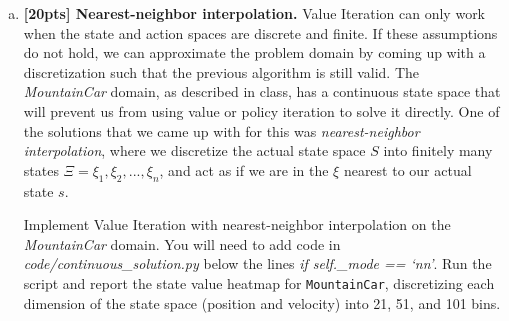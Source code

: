 \documentclass{article}
\begin{document}
\begin{enumerate}[(a)]

\item {\bf [20pts] Nearest-neighbor interpolation.} Value Iteration can only work when the state and action spaces are discrete and finite. If these assumptions do not hold, we can approximate the problem domain by coming up with a discretization such that the previous algorithm is still valid. The \textit{MountainCar} domain, as described in class, has a continuous state space that will prevent us from using value or policy iteration to solve it directly. One of the solutions that we came up with for this was \emph{nearest-neighbor interpolation}, where we discretize the actual state space $S$ into finitely many states $\Xi={\xi_1, \xi_2,...,\xi_n}$, and act as if we are in the $\xi$ nearest to our actual state $s$.

Implement Value Iteration with nearest-neighbor interpolation on the \textit{MountainCar} domain. You will need to add code in \textit{code/continuous\_solution.py} below the lines \textit{if self.\_mode == `nn'}. Run the script and report the state value heatmap for \texttt{MountainCar}, discretizing each dimension of the state space (position and velocity) into 21, 51, and 101 bins.


\end{enumerate}
\end{document}
